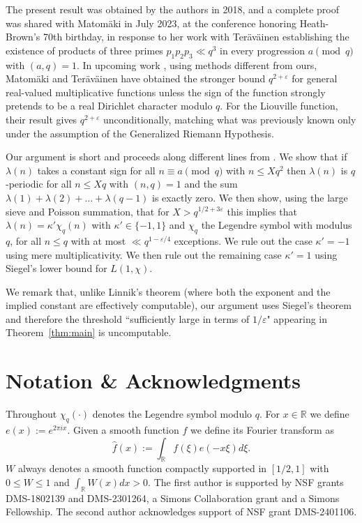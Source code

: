 \documentclass[11pt]{amsart}
\begin{document}
The present result was obtained by the authors in 2018, and a complete proof was shared with Matom\"aki  in July 2023, at the conference honoring Heath-Brown's 70th birthday, in response to her work with Ter\"av\"ainen \cite{MT_products} establishing the existence of products of three primes $p_1 p_2 p_3 \ll q^3$ in every progression $a \pmod{q}$ with $(a,q) = 1$. In upcoming work \cite{MT}, using methods different from ours, Matom\"aki and Ter\"av\"ainen have obtained the stronger bound $q^{2+\varepsilon}$ for general real-valued multiplicative functions unless the sign of the function strongly pretends to be a real Dirichlet character modulo $q$.  For the Liouville function, their result gives $q^{2+\varepsilon}$ unconditionally, matching what was previously known only under the assumption of the Generalized Riemann Hypothesis. 
 
Our argument is short and proceeds along different lines from \cite{MT}. We show that if $\lambda(n)$ takes a constant sign for all $n \equiv a \pmod{q}$ with $n \leq Xq^2$ then $\lambda(n)$ is $q$-periodic for all $n \leq Xq$ with $(n, q) = 1$ and the sum $\lambda(1) + \lambda(2) + \ldots + \lambda(q - 1)$ is exactly zero. We then show, using the large sieve and Poisson summation, that for $X > q^{1/2 + 3\varepsilon}$ this implies that $\lambda(n) = \kappa' \chi_q(n)$ with $\kappa' \in \{-1,1\}$ and $\chi_q$ the Legendre symbol with modulus $q$, for all $n \leq q$ with at most $\ll q^{1 - \varepsilon / 4}$ exceptions. We rule out the case $\kappa' = -1$ using mere multiplicativity. We then rule out the remaining case $\kappa' = 1$ using Siegel's lower bound for $L(1, \chi)$. 

We remark that, unlike Linnik's theorem (where both the exponent and the implied constant 
are effectively computable), our argument
uses Siegel's theorem and therefore the threshold ``sufficiently large in terms of $1 / \varepsilon$" appearing in Theorem~\ref{thm:main} is uncomputable.


\section{Notation \& Acknowledgments}

Throughout $\chi_q(\cdot)$ denotes the Legendre symbol modulo $q$. For $x \in \mathbb{R}$ we define $e(x) := e^{2\pi i x}$. Given a smooth function $f$ we define its Fourier transform as
$$
\widehat{f}(x) := \int_{\mathbb{R}} f(\xi) e(-x \xi) d \xi.
$$
$W$ always denotes a smooth function compactly supported in $[1/2,1]$ with $0 
\leq W \leq 1$ and $\int_{\mathbb{R}} W(x) dx > 0$.
The first author is supported by NSF grants DMS-1802139 and DMS-2301264, a Simons
Collaboration grant and a Simons Fellowship.
The second author acknowledges support of NSF grant DMS-2401106.
\end{document}

